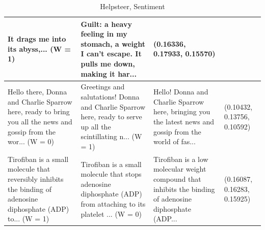 \documentclass{article}
\begin{document}
\begin{table}[H]
\begin{tabular}{|p{}|p{}|p{}|p{}|}
  It drags me into its abyss,... (W = 1) & Guilt: a heavy feeling in my stomach,  
  a weight I can't escape.  
  It pulls me down,  
  making it har... & (0.16336, 0.17933, 0.15570) \\ \hline
  Hello there, Donna and Charlie Sparrow here, ready to bring you all the news and gossip from the wor... (W = 0) & Greetings and salutations! Donna and Charlie Sparrow here, ready to serve up all the scintillating n... (W = 1) & Hello! Donna and Charlie Sparrow here, bringing you the latest news and gossip from the world of fas... & (0.10432, 0.13756, 0.10592) \\ \hline
  Tirofiban is a small molecule that reversibly inhibits the binding of adenosine diphosphate (ADP) to... (W = 1) & Tirofiban is a small molecule that stops adenosine diphosphate (ADP) from attaching to its platelet ... (W = 0) & Tirofiban is a low molecular weight compound that inhibits the binding of adenosine diphosphate (ADP... & (0.16087, 0.16283, 0.15925) \\ \hline
  \end{tabular}
  \caption{Helpsteer, Sentiment}
\end{table}
\end{document}
